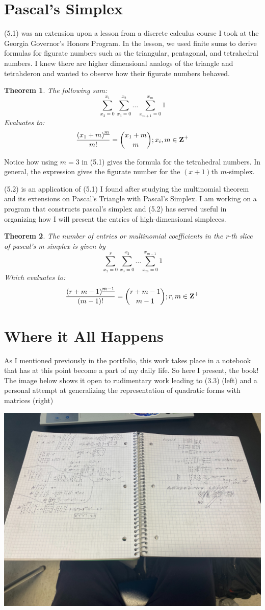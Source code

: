\documentclass{article}
\newtheorem{theorem}{Theorem}[section]
\begin{document}
\section{Pascal's Simplex}

(5.1) was an extension upon a lesson from a discrete calculus course I took at the Georgia Governor's Honors Program. In the lesson, we used finite sums to derive formulas for figurate numbers such as the triangular, pentagonal, and tetrahedral numbers. I knew there are higher dimensional analogs of the triangle and tetrahderon and wanted to observe how their figurate numbers behaved.

\begin{theorem}
    The following sum:
    $$\sum_{x_2 = 0}^{x_1}\sum_{x_3 = 0}^{x_2}\dots\sum_{x_{m+1} = 0}^{x_m}1$$
    Evaluates to:
    $$\frac{{(x_1+m)}^{\underline{m}}}{m!}={{x_1+m} \choose {m}};x_i,m\in\mbox{\textbf{Z}}^+$$
\end{theorem}

Notice how using $m=3$ in (5.1) gives the formula for the tetrahedral numbers. In general, the expression gives the figurate number for the $(x+1)$th $m$-simplex.

(5.2) is an application of (5.1) I found after studying the multinomial theorem and its extensions on Pascal's Triangle with Pascal's Simplex. I am working on a program that constructs pascal's simplex and (5.2) has served useful in organizing how I will present the entries of high-dimensional simpleces.

\begin{theorem}
    The number of entries or multinomial coefficients in the r-th slice of pascal's m-simplex is given by 
    $$\sum_{x_2 = 0}^{r}\sum_{x_3 = 0}^{x_2}\dots\sum_{x_{m} = 0}^{x_{m-1}}1$$
    Which evaluates to:
    $$\frac{{(r+m-1)}^{\underline{m-1}}}{(m-1)!}={{r+m-1} \choose {m-1}};r,m\in\mbox{\textbf{Z}}^+$$
\end{theorem}

\section{Where it All Happens}
As I mentioned previously in the portfolio, this work takes place in a notebook that has at this point become a part of my daily life. So here I present, the book! The image below shows it open to rudimentary work leading to (3.3) (left) and a personal attempt at generalizing the representation of quadratic forms with matrices (right)

\begin{center}
\includegraphics[scale=0.1]{image}
\end{center}
\end{document}
